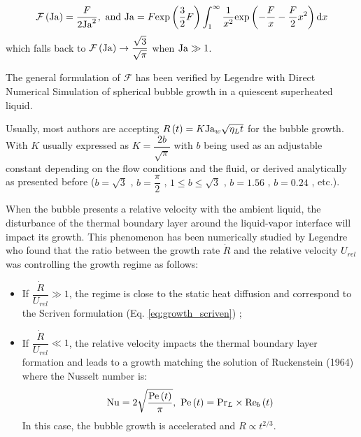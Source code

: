 \begin{equation}
\mathcal{F}\parth{\Ja}=\frac{F}{2\Ja^{2}},\ \text{and}\ \Ja = F\exp{\frac{3}{2}F} \int_{1}^{\infty}\frac{1}{x^{2}}\exp{-\frac{F}{x}-\frac{F}{2}x^{2}}\mathrm{d}x
\end{equation}
which falls back to $\mathcal{F}\left( \mathrm{Ja} \right) \to \dfrac{\sqrt{3}}{\sqrt{\pi}}$ when $\mathrm{Ja} \gg 1$.

\npar
The general formulation of $\mathcal{F}$ has been verified by Legendre \etal \cite{legendre_thermal_1998} with Direct Numerical Simulation of spherical bubble growth in a quiescent superheated liquid.

\npar

Usually, most authors are accepting $R\left( t \right) = K \mathrm{Ja}_{w} \sqrt{\eta_{L}t}$ for the bubble growth. With $K$ usually expressed as $K=\dfrac{2b}{\sqrt{\pi}}$ with $b$ being used as an adjustable constant depending on the flow conditions and the fluid, or derived analytically as presented before ($b=\sqrt{3}$ \cite{plesset_growth_1954}, $b=\dfrac{\pi}{2}$ \cite{forster_growth_1954}, $1 \leq b \leq \sqrt{3}$ \cite{zuber_dynamics_1961}, $b=1.56$ \cite{yun_prediction_2012}, $b=0.24$ \cite{yoo_development_2018}, etc.). 

\npar

When the bubble presents a relative velocity with the ambient liquid, the disturbance of the thermal boundary layer around the liquid-vapor interface will impact its growth. This phenomenon has been numerically studied by Legendre \etal \cite{legendre_thermal_1998} who found that the ratio between the growth rate $\dot{R}$ and the relative velocity $U_{rel}$ was controlling the growth regime as follows:

\begin{itemize}
\item If $\dfrac{\dot{R}}{U_{rel}}\gg 1$, the regime is close to the static heat diffusion and correspond to the Scriven formulation (Eq. \ref{eq:growth_scriven}) ;

\item If $\dfrac{\dot{R}}{U_{rel}}\ll 1$, the relative velocity impacts the thermal boundary layer formation and leads to a growth matching the solution of Ruckenstein (1964) \cite{ruckenstein_mass_1964} where the Nusselt number is:
\begin{equation}
\mathrm{Nu} = 2\sqrt{\frac{\mathrm{Pe}\left( t \right)}{\pi}},\ \mathrm{Pe}\left( t \right) = \mathrm{Pr}_{L}\times \mathrm{Re}_{b}\left( t \right)
\end{equation}
In this case, the bubble growth is accelerated and $R \propto t^{2/3}$. 
\end{itemize}


